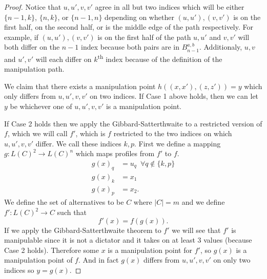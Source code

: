 \begin{proof}
		Notice that $u, u', v, v'$ agree in all but two indices which will be either $\{n - 1, k\}$, $\{n, k\}$, or $\{n - 1, n\}$ depending on whether $(u, u'), (v, v')$ is on the first half, on the second half, or is the middle edge of the path respectively. For example, if $(u, u'), (v, v')$ is on the first half of the path $u, u'$ and $v, v'$ will both differ on the $n - 1$ index because both pairs are in $B^{a,b}_{n-1}$. Additionaly, $u, v$ and $u', v'$ will each differ on $k$\textsuperscript{th} index because of the definition of the manipulation path.

		We claim that there exists a manipulation point $h((x, x'), (z, z')) = y$ which only differs from $u, u', v, v'$ on two indices. If Case 1 above holds, then we can let $y$ be whichever one of $u, u', v, v'$ is a manipulation point.

		If Case 2 holds then we apply the Gibbard-Satterthwaite to a restricted version of $f$, which we will call $f'$, which is $f$ restricted to the two indices on which $u, u', v, v'$ differ. We call these indices $k, p$. First we define a mapping $g : L(C)^2 \rightarrow L(C)^n$ which maps profiles from $f'$ to $f$.
		\begin{align*}
			g(x)_q &= u_q \,\,\, \forall q \notin \{k, p\} \\
			g(x)_k &= x_1 \\
			g(x)_p &= x_2.
		\end{align*}
		We define the set of alternatives to be $C$ where $|C| = m$ and we define $f' : L(C)^2 \rightarrow C$ such that
		\[
			f'(x) = f(g(x)).
		\]
		If we apply the Gibbard-Satterthwaite theorem \cite{gibbard1973manipulation, satterthwaite1975strategy} to $f'$ we will see that $f'$ is manipulable since it is not a dictator and it takes on at least 3 values (because Case 2 holds). Therefore some $x$ is a manipulation point for $f'$, so $g(x)$ is a manipulation point of $f$. And in fact $g(x)$ differs from $u, u', v, v'$ on only two indices so $y = g(x)$.


\end{proof}
